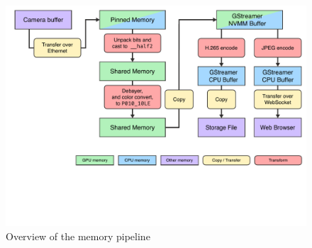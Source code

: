 \begin{figure}[H]
    \centering
    \includegraphics[width=\textwidth]{figures/memory_pipeline/optimal.pdf}
    \caption{Overview of the memory pipeline}
    \label{fig:pipeline_optimal}
\end{figure}